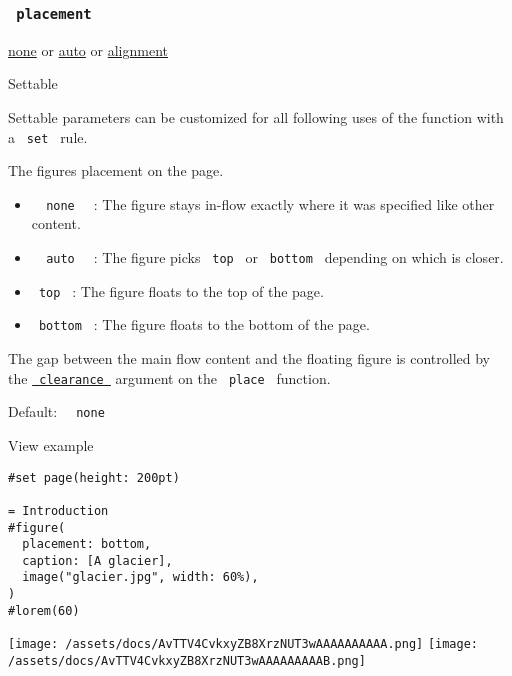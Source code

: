 \subsubsection{\texorpdfstring{\texttt{\ placement\ }}{ placement }}\label{parameters-placement}

\href{/docs/reference/foundations/none/}{none} {or}
\href{/docs/reference/foundations/auto/}{auto} {or}
\href{/docs/reference/layout/alignment/}{alignment}

{{ Settable }}

\label{parameters-placement-settable-tooltip}
Settable parameters can be customized for all following uses of the
function with a \texttt{\ set\ } rule.

The figure\textquotesingle s placement on the page.

\begin{itemize}
\tightlist
\item
  \texttt{\ }{\texttt{\ none\ }}\texttt{\ } : The figure stays in-flow
  exactly where it was specified like other content.
\item
  \texttt{\ }{\texttt{\ auto\ }}\texttt{\ } : The figure picks
  \texttt{\ top\ } or \texttt{\ bottom\ } depending on which is closer.
\item
  \texttt{\ top\ } : The figure floats to the top of the page.
\item
  \texttt{\ bottom\ } : The figure floats to the bottom of the page.
\end{itemize}

The gap between the main flow content and the floating figure is
controlled by the
\href{/docs/reference/layout/place/\#parameters-clearance}{\texttt{\ clearance\ }}
argument on the \texttt{\ place\ } function.

Default: \texttt{\ }{\texttt{\ none\ }}\texttt{\ }


View example

\begin{verbatim}
#set page(height: 200pt)

= Introduction
#figure(
  placement: bottom,
  caption: [A glacier],
  image("glacier.jpg", width: 60%),
)
#lorem(60)
\end{verbatim}

\texttt{[image: /assets/docs/AvTTV4CvkxyZB8XrzNUT3wAAAAAAAAAA.png]}
\texttt{[image: /assets/docs/AvTTV4CvkxyZB8XrzNUT3wAAAAAAAAAB.png]}

